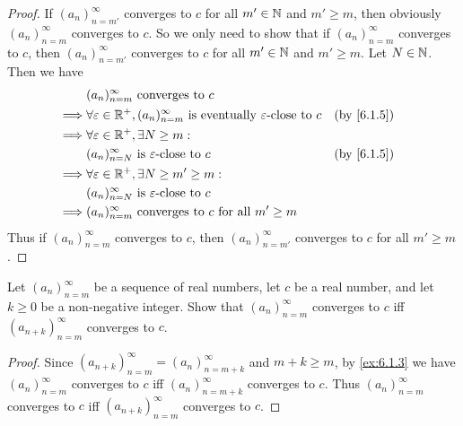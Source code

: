 \begin{proof}
  If \((a_n)_{n = m'}^\infty\) converges to \(c\) for all \(m' \in \mathbb{N}\) and \(m' \geq m\), then obviously \((a_n)_{n = m}^\infty\) converges to \(c\).
  So we only need to show that if \((a_n)_{n = m}^\infty\) converges to \(c\), then \((a_n)_{n = m'}^\infty\) converges to \(c\) for all \(m' \in \mathbb{N}\) and \(m' \geq m\).
  Let \(N \in \mathbb{N}\).
  Then we have
  \begin{align*}
             & (a_n)_{n = m}^\infty \text{ converges to } c                                                                             \\
    \implies & \forall \varepsilon \in \R^+, (a_n)_{n = m}^\infty \text{ is eventually } \varepsilon\text{-close to } c &  & \by{6.1.5} \\
    \implies & \forall \varepsilon \in \R^+, \exists N \geq m :                                                                         \\
             & (a_n)_{n = N}^\infty \text{ is } \varepsilon\text{-close to } c                                          &  & \by{6.1.5} \\
    \implies & \forall \varepsilon \in \R^+, \exists N \geq m' \geq m :                                                                 \\
             & (a_n)_{n = N}^\infty \text{ is } \varepsilon\text{-close to } c                                                          \\
    \implies & (a_n)_{n = m}^\infty \text{ converges to } c \text{ for all } m' \geq m
  \end{align*}
  Thus if \((a_n)_{n = m}^\infty\) converges to \(c\), then \((a_n)_{n = m'}^\infty\) converges to \(c\) for all \(m' \geq m\).
\end{proof}

\begin{ex}\label{ex:6.1.4}
  Let \((a_n)_{n = m}^\infty\) be a sequence of real numbers, let \(c\) be a real number, and let \(k \geq 0\) be a non-negative integer.
  Show that \((a_n)_{n = m}^\infty\) converges to \(c\) iff \((a_{n + k})_{n = m}^\infty\) converges to \(c\).
\end{ex}

\begin{proof}
  Since \((a_{n + k})_{n = m}^\infty = (a_n)_{n = m + k}^\infty\) and \(m + k \geq m\), by \cref{ex:6.1.3} we have \((a_n)_{n = m}^\infty\) converges to \(c\) iff \((a_n)_{n = m + k}^\infty\) converges to \(c\).
  Thus \((a_n)_{n = m}^\infty\) converges to \(c\) iff \((a_{n + k})_{n = m}^\infty\) converges to \(c\).
\end{proof}

